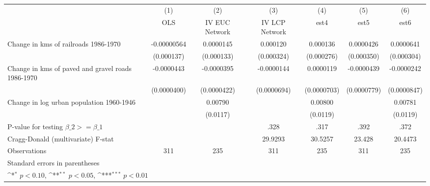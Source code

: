 {
\def\sym#1{\ifmmode^{#1}\else\(^{#1}\)\fi}
\begin{tabular}{l*{6}{c}}
\hline\hline
                &\multicolumn{1}{c}{(1)}&\multicolumn{1}{c}{(2)}&\multicolumn{1}{c}{(3)}&\multicolumn{1}{c}{(4)}&\multicolumn{1}{c}{(5)}&\multicolumn{1}{c}{(6)}\\
                &\multicolumn{1}{c}{OLS}&\multicolumn{1}{c}{IV EUC Network}&\multicolumn{1}{c}{IV LCP Network}&\multicolumn{1}{c}{est4}&\multicolumn{1}{c}{est5}&\multicolumn{1}{c}{est6}\\
\hline
Change in kms of railroads 1986-1970&-0.00000564         &0.0000145         & 0.000120         & 0.000136         &0.0000426         &0.0000641         \\
                &(0.000137)         &(0.000133)         &(0.000324)         &(0.000276)         &(0.000350)         &(0.000304)         \\
[1em]
Change in kms of paved and gravel roads 1986-1970&-0.0000443         &-0.0000395         &-0.0000144         &0.0000119         &-0.0000439         &-0.0000242         \\
                &(0.0000400)         &(0.0000422)         &(0.0000694)         &(0.0000703)         &(0.0000779)         &(0.0000847)         \\
[1em]
Change in log urban population 1960-1946&                  &  0.00790         &                  &  0.00800         &                  &  0.00781         \\
                &                  & (0.0117)         &                  & (0.0119)         &                  & (0.0119)         \\
\hline
P-value for testing $\beta\_{2} >= \beta\_{1}$&                  &                  &     .328         &     .317         &     .392         &     .372         \\
Cragg-Donald (multivariate) F-stat&                  &                  &  29.9293         &  30.5257         &   23.428         &  20.4473         \\
Observations    &      311         &      235         &      311         &      235         &      311         &      235         \\
\hline\hline
\multicolumn{7}{l}{\footnotesize Standard errors in parentheses}\\
\multicolumn{7}{l}{\footnotesize \sym{*} \(p<0.10\), \sym{**} \(p<0.05\), \sym{***} \(p<0.01\)}\\
\end{tabular}
}
